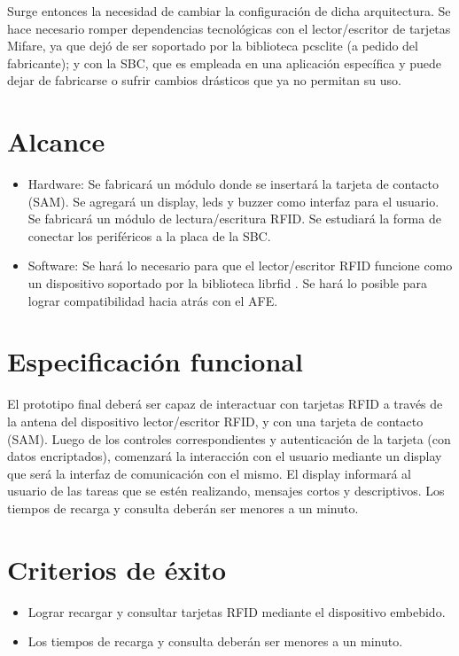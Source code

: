 Surge entonces la necesidad de cambiar la configuraci\'on de dicha arquitectura. Se hace necesario romper dependencias tecnol\'ogicas con el lector/escritor de tarjetas Mifare, ya que dej\'o de ser soportado por la biblioteca pcsclite \cite{pcsclite} (a pedido del fabricante); y con la SBC, que es empleada en una aplicaci\'on espec\'ifica y puede dejar de fabricarse o sufrir cambios dr\'asticos que ya no permitan su uso.


\section{Alcance}

\begin{itemize}

\item Hardware: Se fabricar\'a un m\'odulo donde se insertar\'a la tarjeta de contacto (SAM).
Se agregar\'a un display, leds y buzzer como interfaz para el usuario. Se fabricar\'a un m\'odulo de lectura/escritura RFID. Se estudiar\'a la forma de conectar los perif\'ericos a la placa de la SBC.

\item Software: Se har\'a lo necesario para que el lector/escritor RFID funcione como un dispositivo soportado por la biblioteca librfid \cite{librfid}. Se hará lo posible para lograr compatibilidad hacia atrás con el AFE.
    
\end{itemize}

\section{Especificaci\'on funcional}

El prototipo final deber\'a ser capaz de interactuar con tarjetas RFID a trav\'es de la antena del dispositivo lector/escritor RFID, y con una tarjeta de contacto (SAM). Luego de los controles correspondientes y autenticaci\'on de la tarjeta (con datos encriptados), comenzar\'a la interacci\'on con el usuario mediante un display que ser\'a la interfaz de comunicaci\'on con el mismo. El display informar\'a al usuario de las tareas que se est\'en realizando, mensajes cortos y descriptivos. Los tiempos de recarga y consulta deber\'an ser menores a un minuto.

\section{Criterios de \'exito}

\begin{itemize}

\item Lograr recargar y consultar tarjetas RFID mediante el dispositivo embebido.

\item Los tiempos de recarga y consulta deber\'an ser menores a un minuto.

\end{itemize}